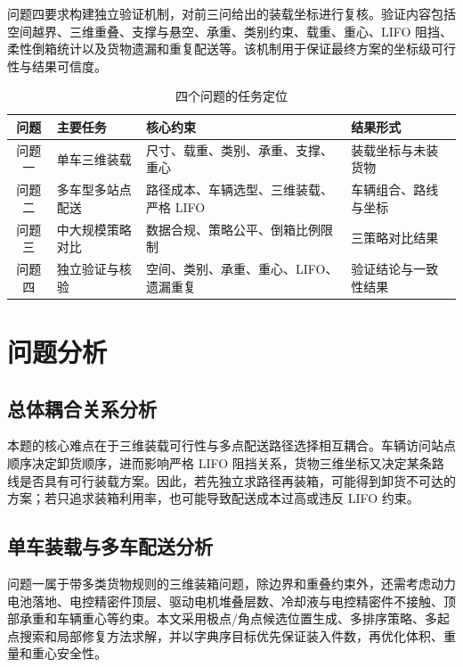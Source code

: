 ﻿\documentclass[UTF8,a4paper,12pt]{ctexart}
\begin{document}
	问题四要求构建独立验证机制，对前三问给出的装载坐标进行复核。验证内容包括空间越界、三维重叠、支撑与悬空、承重、类别约束、载重、重心、LIFO 阻挡、柔性倒箱统计以及货物遗漏和重复配送等。该机制用于保证最终方案的坐标级可行性与结果可信度。
	
	\begin{table}[H]
		\centering
		\caption{四个问题的任务定位}
		\label{tab:problem_relation}
		\begin{tabular}{c p{4.0cm} p{5.4cm} p{3.0cm}}
			\toprule
			问题 & 主要任务 & 核心约束 & 结果形式 \\
			\midrule
			问题一 & 单车三维装载 & 尺寸、载重、类别、承重、支撑、重心 & 装载坐标与未装货物 \\
			问题二 & 多车型多站点配送 & 路径成本、车辆选型、三维装载、严格 LIFO & 车辆组合、路线与坐标 \\
			问题三 & 中大规模策略对比 & 数据合规、策略公平、倒箱比例限制 & 三策略对比结果 \\
			问题四 & 独立验证与核验 & 空间、类别、承重、重心、LIFO、遗漏重复 & 验证结论与一致性结果 \\
			\bottomrule
		\end{tabular}
	\end{table}
	
	
	\section{问题分析}
	
	\subsection{总体耦合关系分析}
	
	本题的核心难点在于三维装载可行性与多点配送路径选择相互耦合。车辆访问站点顺序决定卸货顺序，进而影响严格 LIFO 阻挡关系，货物三维坐标又决定某条路线是否具有可行装载方案。因此，若先独立求路径再装箱，可能得到卸货不可达的方案；若只追求装箱利用率，也可能导致配送成本过高或违反 LIFO 约束。
	
	\subsection{单车装载与多车配送分析}
	
	问题一属于带多类货物规则的三维装箱问题，除边界和重叠约束外，还需考虑动力电池落地、电控精密件顶层、驱动电机堆叠层数、冷却液与电控精密件不接触、顶部承重和车辆重心等约束。本文采用极点/角点候选位置生成、多排序策略、多起点搜索和局部修复方法求解，并以字典序目标优先保证装入件数，再优化体积、重量和重心安全性。
	
\end{document}

